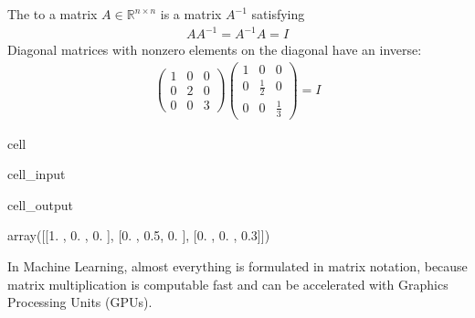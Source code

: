 \documentclass[letterpaper,10pt,english]{jupyterBook}
\begin{document}
\sphinxAtStartPar
The  to a matrix \(A\in\mathbb{R}^{n\times n}\) is a matrix \(A^{-1}\) satisfying
\begin{equation*}
\begin{split}AA^{-1} = A^{-1}A = I\end{split}
\end{equation*}
Diagonal matrices with nonzero elements on the diagonal have an inverse:
\begin{align*}\begin{pmatrix} 1& 0 & 0\\
0 & 2 & 0\\
0 & 0 & 3\end{pmatrix}
\begin{pmatrix}1& 0 & 0\\
0 & \frac12 & 0\\
0 & 0 & \frac13\end{pmatrix} = I\end{align*}
\begin{sphinxuseclass}{cell}\begin{sphinxVerbatimInput}

\begin{sphinxuseclass}{cell_input}
\begin{sphinxVerbatim}[commandchars=\\\{\}]
  \PYG{p}{[}\PYG{p}{]}
\end{sphinxVerbatim}

\end{sphinxuseclass}\end{sphinxVerbatimInput}
\begin{sphinxVerbatimOutput}

\begin{sphinxuseclass}{cell_output}
\begin{sphinxVerbatim}[commandchars=\\\{\}]
array([[1. , 0. , 0. ],
       [0. , 0.5, 0. ],
       [0. , 0. , 0.3]])
\end{sphinxVerbatim}

\end{sphinxuseclass}\end{sphinxVerbatimOutput}

\end{sphinxuseclass}
\sphinxAtStartPar
In Machine Learning, almost everything is formulated in matrix notation, because matrix multiplication is computable fast and can be accelerated with Graphics Processing Units (GPUs).
\end{document}
